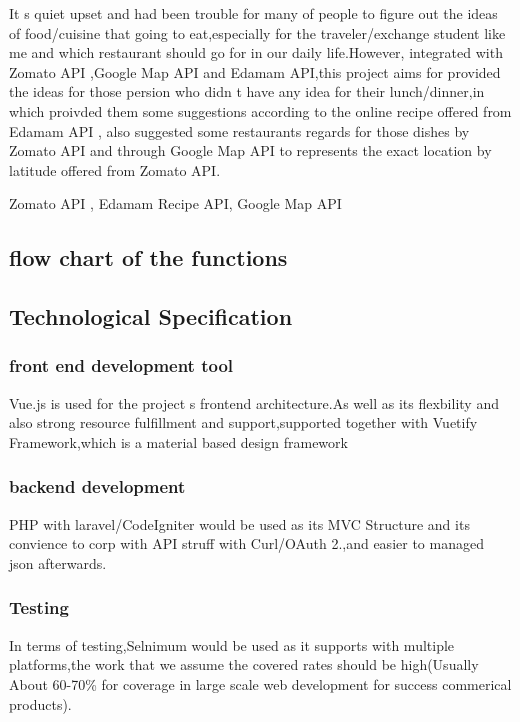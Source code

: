 It \textquotesingle{}s quiet upset and had been trouble for many of people to figure out the ideas of food/cuisine that going to eat,especially for the traveler/exchange student like me and which restaurant should go for in our daily life.\+However, integrated with Zomato A\+PI ,Google Map A\+PI and Edamam A\+PI,this project aims for provided the ideas for those persion who didn \textquotesingle{}t have any idea for their lunch/dinner,in which proivded them some suggestions according to the online recipe offered from Edamam A\+PI , also suggested some restaurants regards for those dishes by Zomato A\+PI and through Google Map A\+PI to represents the exact location by latitude offered from Zomato A\+PI.

 Zomato A\+PI , Edamam Recipe A\+PI,  Google Map A\+PI

\subsection*{flow chart of the functions}



\subsection*{Technological Specification}

\subsubsection*{front end development tool}

Vue.\+js is used for the project \textquotesingle{}s frontend architecture.\+As well as its flexbility and also strong resource fulfillment and support,supported together with Vuetify Framework,which is a material based design framework

\subsubsection*{backend development}

P\+HP with laravel/\+Code\+Igniter would be used as its M\+VC Structure and its convience to corp with A\+PI struff with Curl/\+O\+Auth 2.,and easier to managed json afterwards.

\subsubsection*{Testing}

In terms of testing,Selnimum would be used as it supports with multiple platforms,the work that we assume the covered rates should be high(Usually About 60-\/70\% for coverage in large scale web development for success commerical products).

